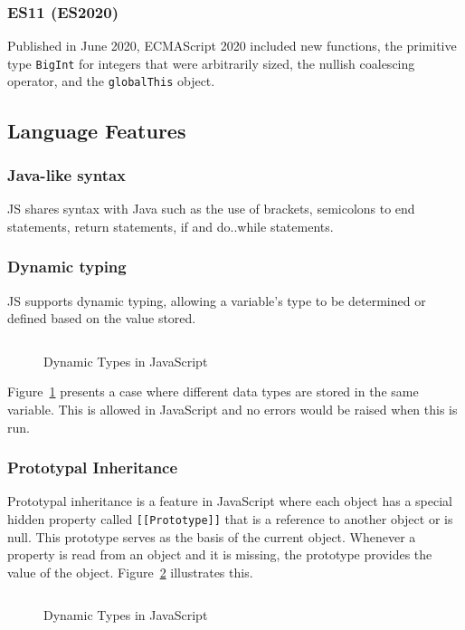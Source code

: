 \documentclass{article}
\newcommand{\js}[1]{\inputminted{javascript}{samples/js/#1.js}}
\newcommand{\jsin}[1]{\texttt{#1}}
\begin{document}
    \subsubsection{ES11 (ES2020)}
    Published in June 2020, ECMAScript 2020 included new functions, the
    primitive type \jsin{BigInt} for integers that were arbitrarily sized, 
    the nullish coalescing operator, and the \jsin{globalThis} object.

    \subsection{Language Features}

    \subsubsection{Java-like syntax}
    JS shares syntax with Java such as the use of brackets, semicolons to end
    statements, return statements, if and do..while statements.

    \subsubsection{Dynamic typing}
    JS supports dynamic typing, allowing a variable’s type to be
    determined or defined based on the value stored.

    \begin{figure}[ht]
      \js{dynamic-typing}
      \caption{Dynamic Types in JavaScript}
      \label{fig:dynamic-typing}
    \end{figure}

    Figure~\ref{fig:dynamic-typing} presents a case where different data types
    are stored in the same variable. This is allowed in JavaScript and no errors
    would be raised when this is run.

    \subsubsection{Prototypal Inheritance}
    Prototypal inheritance is a feature in JavaScript where each object has a
    special hidden property called \jsin{[[Prototype]]} that is a reference to
    another object or is null. This prototype serves as the basis of the current
    object. Whenever a property is read from an object and it is missing, the
    prototype provides the value of the object. Figure~\ref{fig:prototype}
    illustrates this.

    \begin{figure}[ht]
      \js{prototype}
      \caption{Dynamic Types in JavaScript}
      \label{fig:prototype}
    \end{figure}
\end{document}
